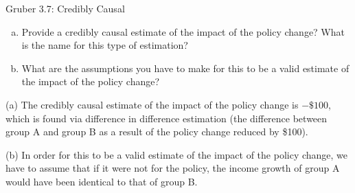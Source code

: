 \documentclass[10pt]{extarticle}
\begin{document}
{\begin{problem}{Gruber 3.7: Credibly Causal}
    \begin{enumerate}[(a)]
      \item Provide a credibly causal estimate of the impact of the policy change? What is the name for this type of estimation?
      \item What are the assumptions you have to make for this to be a valid estimate of the impact of the policy change?
    \end{enumerate}
    \begin{problem}{(a)}
      The credibly causal estimate of the impact of the policy change is $-\$100$, which is found via difference in difference estimation (the difference between group A and group B as a result of the policy change reduced by \$100).
    \end{problem}
    \begin{problem}{(b)}
      In order for this to be a valid estimate of the impact of the policy change, we have to assume that if it were not for the policy, the income growth of group A would have been identical to that of group B.
    \end{problem}
  \end{problem}
}
\end{document}
